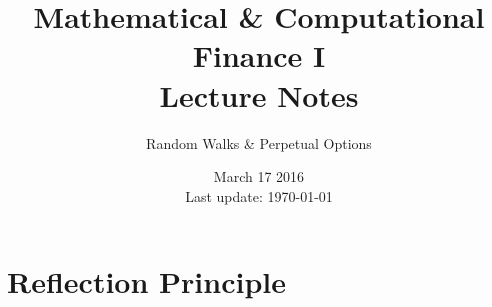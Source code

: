 \documentclass[12pt]{article}
\begin{document}
 
 
\title{Mathematical \& Computational Finance I\\Lecture Notes}
\author{Random Walks \& Perpetual Options}
\date{March 17 2016 \\ Last update: \today{}}
\maketitle

\section{Reflection Principle}
\end{document}
